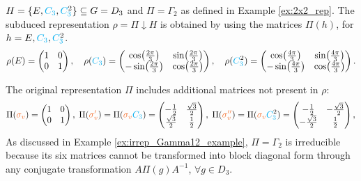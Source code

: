 \begin{example} \label{ex:C3_D3_subduction_example}
$H = \{E, \Ct, \Ctn{2}\} \subseteq G = D_3$ and $\Pi = \Gamma_2$ as defined in Example \ref{ex:2x2_rep}. The subduced representation $\rho = \Pi \downarrow H$ is obtained by using the matrices $\Pi(h)$, for $h = E, \Ct, \Ctn{2}$.
\begin{equation} \label{eq:rho_subduced_C3_D3_subduction_example}
\rho(E) =
\begin{pmatrix}
1 & 0 \\
0 & 1
\end{pmatrix},
\quad
\rho(\Ct) =
\begin{pmatrix}
\cos(\frac{2\pi}{3}) & \sin(\frac{2\pi}{3}) \\
-\sin(\frac{2\pi}{3}) & \cos(\frac{2\pi}{3})
\end{pmatrix},
\quad
\rho(\Ctn{2}) =
\begin{pmatrix}
\cos(\frac{4\pi}{3}) & \sin(\frac{4\pi}{3}) \\
-\sin(\frac{4\pi}{3}) & \cos(\frac{4\pi}{3})
\end{pmatrix}.
\end{equation}

The original representation \(\Pi\) includes additional matrices not present in \(\rho\):
\begin{equation} \label{eq:Pi_C3_D3_subduction_example}
\Pi(\sv) =
\begin{pmatrix}
1 & 0 \\
0 & 1
\end{pmatrix},
\;
\Pi(\svp) = \Pi(\sv \Ct) =
\begin{pmatrix}
-\frac{1}{2} & \frac{\sqrt{3}}{2} \\
\frac{\sqrt{3}}{2} & \frac{1}{2}
\end{pmatrix},
\;
\Pi(\svpp) = \Pi(\sv \Ctn{2}) =
\begin{pmatrix}
-\frac{1}{2} & -\frac{\sqrt{3}}{2} \\
-\frac{\sqrt{3}}{2} & \frac{1}{2}
\end{pmatrix},
\end{equation}
As discussed in Example \ref{ex:irrep_Gamma12_example}, \(\Pi = \Gamma_2\) is irreducible because its six matrices cannot be transformed into block diagonal form through any conjugate transformation \(A \Pi(g) A^{-1}\), \(\forall g \in D_3\).


\end{example}
